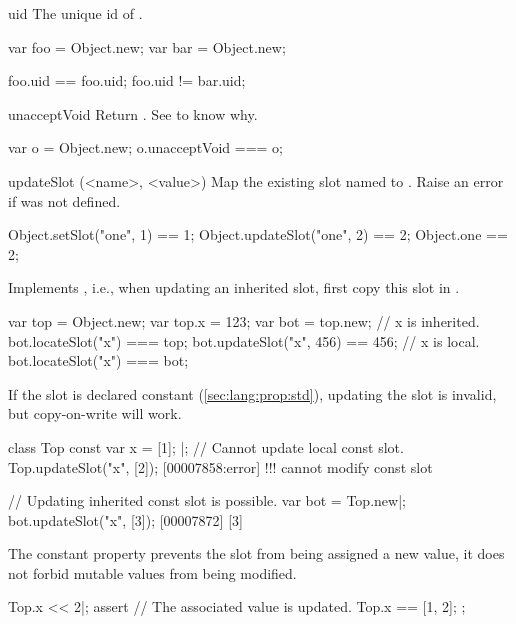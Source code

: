 \begin{urbiscriptapi}
\item[uid]
  The unique id of \this.
\begin{urbiassert}
var foo = Object.new;
var bar = Object.new;

foo.uid == foo.uid;
foo.uid != bar.uid;
\end{urbiassert}


\item[unacceptVoid]%
  Return \this.  See  to know why.
\begin{urbiassert}
var o = Object.new;
o.unacceptVoid === o;
\end{urbiassert}



\item[updateSlot](<name>, <value>)%
  Map the existing slot named  to . Raise an
  error if  was not defined.
\begin{urbiassert}
Object.setSlot("one", 1)    == 1;
Object.updateSlot("one", 2) == 2;
Object.one                  == 2;
\end{urbiassert}

  Implements , i.e., when updating an inherited slot,
  first copy this slot in \this.

\begin{urbiassert}
var top = Object.new;
var top.x = 123;
var bot = top.new;
// x is inherited.
bot.locateSlot("x") === top;
bot.updateSlot("x", 456) == 456;
// x is local.
bot.locateSlot("x") === bot;
\end{urbiassert}

  If the slot is declared constant (\autoref{sec:lang:prop:std}), updating
  the slot is invalid, but copy-on-write will work.

\begin{urbiscript}
class Top
{
  const var x = [1];
}|;
// Cannot update local const slot.
Top.updateSlot("x", [2]);
[00007858:error] !!! cannot modify const slot

// Updating inherited const slot is possible.
var bot = Top.new|;
bot.updateSlot("x", [3]);
[00007872] [3]
\end{urbiscript}

  The constant property prevents the slot from being assigned a new value,
  it does not forbid mutable values from being modified.

\begin{urbiscript}
Top.x << 2|;
assert
{
  // The associated value is updated.
  Top.x == [1, 2];
};
\end{urbiscript}
\end{urbiscriptapi}

